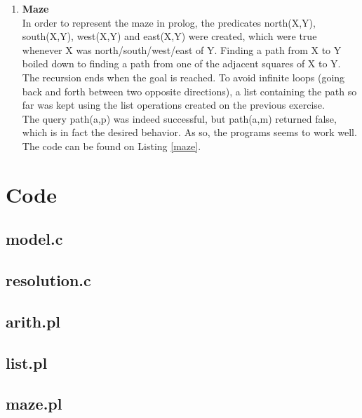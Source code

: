 \documentclass{article}
\begin{document}
\begin{enumerate}
\item \textbf{Maze} \\
In order to represent the maze in prolog, the predicates north(X,Y), south(X,Y), west(X,Y) and east(X,Y) were created, which were true whenever X was north/south/west/east of Y. Finding a path from X to Y  boiled down to finding a path from one of the adjacent squares of X to Y. The recursion ends when the goal is reached. To avoid infinite loops (going back and forth between two opposite directions), a list containing the path so far was kept using the list operations created on the previous exercise.\\
The query path(a,p) was indeed successful, but path(a,m) returned false, which is in fact the desired behavior. As so, the programs seems to work well.
The code can be found on Listing \ref{maze}.
\end{enumerate}

\section{Code}

\subsection*{model.c}


\subsection*{resolution.c}


\subsection*{arith.pl}


\subsection*{list.pl}


\subsection*{maze.pl}

\end{document}
